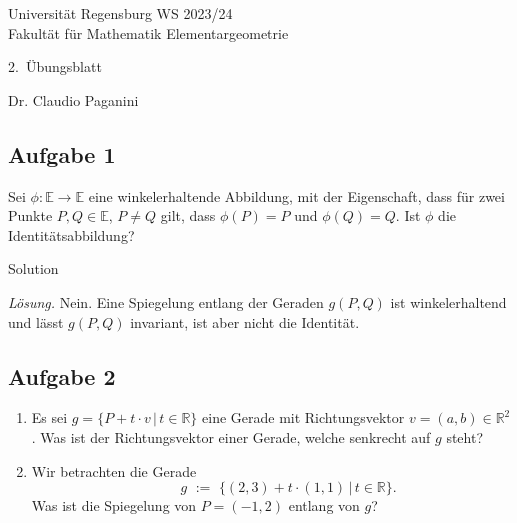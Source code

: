 \documentclass[12pt]{amsart}
\theoremstyle{plain}
\theoremstyle{remark}
\def\R{\mathbb{R}}
\numberwithin{equation}{section}
\def\enm{\end{enumerate}}
\def\E{\mathbb{E}}
\def\bnal{\begin{enumerate}[label=(\alph*),leftmargin=1.2cm]}
\begin{document}
\noindent
{\sc
	Universit\"at Regensburg \hfill WS 2023/24 \\
	Fakult\"at f\"ur Mathematik \hfill Elementargeometrie \\
\begin{center}
	2.\ \"Ubungsblatt\\
\end{center}	
}
\begin{center}
	 Dr. Claudio Paganini \\
\end{center}
\vspace{0.5cm}
\medskip



\subsection*{Aufgabe 1}\mbox{}
Sei $\phi: \E \rightarrow\E $ eine winkelerhaltende Abbildung, mit der Eigenschaft, dass f\"ur zwei Punkte $P,Q\in \E$, $P\neq Q$ gilt, dass $\phi(P)=P$ und $\phi(Q)=Q$. Ist $\phi$ die Identit\"atsabbildung?


\begin{taggedblock}{Solution}
    


\smallskip 
\noindent \emph{L\"osung.}\mbox{}
Nein. Eine Spiegelung entlang der Geraden $g(P,Q)$ ist winkelerhaltend und l\"asst $g(P,Q)$ invariant, ist aber nicht die Identit\"at. 

\end{taggedblock}


\subsection*{Aufgabe 2}\mbox{}
\bnal
\item 
Es sei $g=\{ P+t\cdot v\,|\, t\in \R\}$ eine Gerade mit Richtungsvektor $v=(a,b)\in \R^2$.
Was ist der Richtungsvektor einer Gerade, welche senkrecht auf $g$ steht?
\item Wir betrachten die Gerade 
\[ \hspace{1cm} g\,\,:=\,\, \{ (2,3)+t\cdot (1,1)\,|\, t\in \R\}.\]
Was ist die Spiegelung von $P=(-1,2)$ entlang von $g$?
\enm
\end{document}
